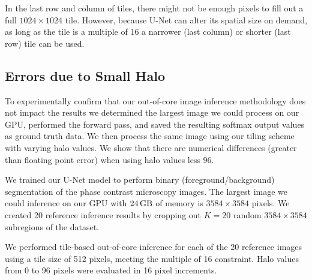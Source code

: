 \documentclass[runningheads]{llncs}
\begin{document}

In the last row and column of tiles, there might not be enough pixels to fill out a full $1024 \times 1024$ tile. However, because U-Net can alter its spatial size on demand, as long as the tile is a multiple of 16 a narrower (last column) or shorter (last row) tile can be used. 


\subsection{Errors due to Small Halo}

To experimentally confirm that our out-of-core image inference methodology does not impact the results we determined the largest image we could process on our GPU, performed the forward pass, and saved the resulting softmax output values as ground truth data. We then process the same image using our tiling scheme with varying halo values. We show that there are numerical differences (greater than floating point error) when using halo values less 96. 

We trained our U-Net model to perform binary (foreground/background) segmentation of the phase contrast microscopy images. The largest image we could inference on our GPU with $\SI{24}{\giga\byte}$ of memory is $3584 \times 3584$ pixels. We created 20 reference inference results by cropping out $K = 20$ random $3584 \times 3584$ subregions of the dataset. 

We performed tile-based out-of-core inference for each of the 20 reference images using a tile size of 512 pixels, meeting the multiple of 16 constraint. Halo values from 0 to 96 pixels were evaluated in 16 pixel increments. 
\end{document}
